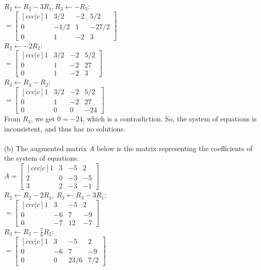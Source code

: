 \documentclass[a4paper]{article}
\begin{document}
\begin{enumerate}
$R_2 \leftarrow R_2 - 3R_1, R_3 \leftarrow -R_3$:\\
$= \begin{bmatrix}[ccc|c]
    1 & 3/2 & -2 & 5/2\\
    0 & -1/2 & 1 & -27/2\\
    0 & 1 & -2 & 3
\end{bmatrix}$\\

$R_2 \leftarrow -2R_2$:\\
$= \begin{bmatrix}[ccc|c]
    1 & 3/2 & -2 & 5/2\\
    0 & 1 & -2 & 27\\
    0 & 1 & -2 & 3
\end{bmatrix}$\\

$R_3 \leftarrow R_3 - R_2$:\\
$= \begin{bmatrix}[ccc|c]
    1 & 3/2 & -2 & 5/2\\
    0 & 1 & -2 & 27\\
    0 & 0 & 0 & -24
\end{bmatrix}$\\

From $R_3$, we get $0 = -24$, which is a contradiction. So, the system of equations is inconsistent, and thus has no solutions.\\
\\
(b) The augmented matrix $A$ below is the matrix representing the coefficients of the system of equations.\\

$A = \begin{bmatrix}[ccc|c]
    1 & 3 & -5 & 2\\
    2 & 0 & -3 & -5\\
    3 & 2 & -3 & -1
\end{bmatrix}$\\

$R_2 \leftarrow R_2 - 2R_1,\ R_3 \leftarrow R_3 - 3R_1$:\\
$= \begin{bmatrix}[ccc|c]
    1 & 3 & -5 & 2\\
    0 & -6 & 7 & -9\\
    0 & -7 & 12 & -7
\end{bmatrix}$\\

$R_3 \leftarrow R_3 - \frac{7}{6} R_2$:\\
$= \begin{bmatrix}[ccc|c]
    1 & 3 & -5 & 2\\
    0 & -6 & 7 & -9\\
    0 & 0 & 23/6 & 7/2
\end{bmatrix}$\\


\end{enumerate}
\end{document}

